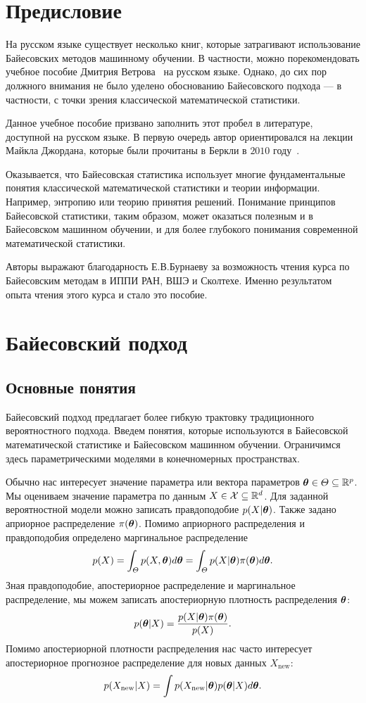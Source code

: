\section{Предисловие}

На русском языке существует несколько книг, 
которые затрагивают использование Байесовских методов машинному обучении.
В частности, можно порекомендовать учебное пособие Дмитрия Ветрова~\cite{vetrov2007bayesian} на русском языке.
Однако, до сих пор должного внимания не было уделено обоснованию Байесовского подхода --- в частности, 
с точки зрения классической математической статистики.

Данное учебное пособие призвано заполнить этот пробел в 
литературе, доступной на русском языке.
В первую очередь автор ориентировался на лекции Майкла Джордана, 
которые были прочитаны в Беркли в $2010$ году~\cite{jordan10notes}.

Оказывается, что Байесовская статистика использует 
многие фундаментальные понятия классической математической статистики и теории информации. 
Например, энтропию или теорию принятия решений.
Понимание принципов Байесовской статистики, таким образом, может оказаться полезным и в Байесовском машинном обучении, и для более глубокого понимания
современной математической статистики.

Авторы выражают благодарность Е.В.Бурнаеву за возможность чтения курса по Байесовским методам в ИППИ РАН, ВШЭ и Сколтехе.
Именно результатом опыта чтения этого курса и стало это пособие.

\section{Байесовский подход}

\subsection{Основные понятия}
Байесовский подход предлагает более гибкую трактовку традиционного вероятностного подхода.
Введем понятия, которые используются в Байесовской математической статистике и Байесовском машинном обучении.
Ограничимся здесь параметрическими моделями в конечномерных пространствах.

Обычно нас интересует значение параметра или вектора параметров
$\boldsymbol{\theta} \in \varTheta \subseteq \mathbb{R}^p$.
Мы оцениваем значение параметра по данным $X \in \mathcal{X} \subseteq \mathbb{R}^d$.
Для заданной вероятностной модели можно записать правдоподобие 
$p(X | \boldsymbol{\theta})$.
Также задано априорное распределение $\pi(\boldsymbol{\theta})$.
Помимо априорного распределения и правдоподобия определено
маргинальное распределение 
\[
p(X) = \int_{\varTheta} p(X, \boldsymbol{\theta}) d\boldsymbol{\theta} = \int_{\varTheta} p(X| \boldsymbol{\theta}) \pi(\boldsymbol{\theta}) d\boldsymbol{\theta}.
\]
Зная правдоподобие, апостериорное распределение и маргинальное распределение, мы можем записать
апостериорную плотность распределения $\boldsymbol{\theta}$:
\[
p(\boldsymbol{\theta} | X) = \frac{p(X | \boldsymbol{\theta}) \pi(\boldsymbol{\theta})}{p(X)}.
\]
Помимо апостериорной плотности распределения нас 
часто интересует апостериорное прогнозное распределение для новых данных $X_{\mathrm{new}}$:
\[
p(X_{\mathrm{new}} | X) = \int p(X_{\mathrm{new}} | \boldsymbol{\theta}) p(\boldsymbol{\theta} | X) d\boldsymbol{\theta}.
\]

